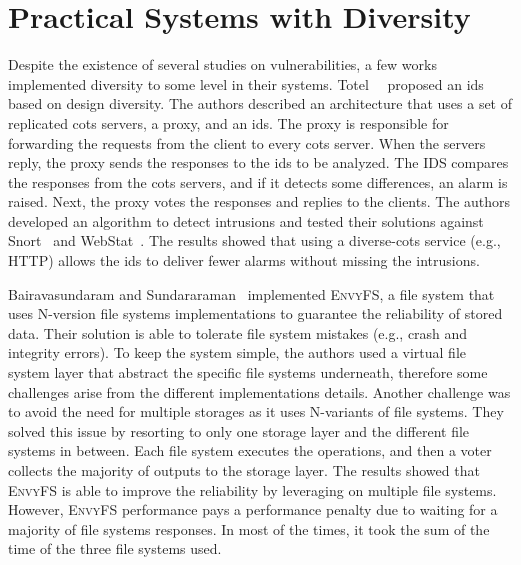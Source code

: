 \section{Practical Systems with Diversity}
Despite the existence of several studies on vulnerabilities, a few works implemented diversity to some level in their systems.
Totel~\etal{}~\cite{Totel:2005} proposed an \gls{ids} based on design diversity.
The authors described an architecture that uses a set of replicated \gls{cots} servers, a proxy, and an \gls{ids}. 
The proxy is responsible for forwarding the requests from the client to every \gls{cots} server. 
When the servers reply, the proxy sends the responses to the \gls{ids} to be analyzed. 
The IDS compares the responses from the \gls{cots} servers, and if it detects some differences, an alarm is raised. 
Next, the proxy votes the responses and replies to the clients. 
The authors developed an algorithm to detect intrusions and tested their solutions against Snort~\cite{snort} and WebStat~\cite{Vigna:2003}. 
The results showed that using a diverse-\gls{cots} service (e.g., HTTP) allows the \gls{ids} to deliver fewer alarms without missing the intrusions.

Bairavasundaram and Sundararaman~\cite{Bairavasundaram:2009} implemented \textsc{EnvyFS}, a file system that uses N-version file systems implementations to guarantee the reliability of stored data.
Their solution is able to tolerate file system mistakes (e.g., crash and integrity errors). 
To keep the system simple, the authors used a virtual file system layer that abstract the specific file systems underneath, therefore some challenges arise from the different implementations details.
Another challenge was to avoid the need for multiple storages as it uses N-variants of file systems. 
They solved this issue by resorting to only one storage layer and the different file systems in between. 
Each file system executes the operations, and then a voter collects the majority of outputs to the storage layer.
The results showed that \textsc{EnvyFS} is able to improve the reliability by leveraging on multiple file systems.
However, \textsc{EnvyFS} performance pays a performance penalty due to waiting for a majority of file systems responses. 
In most of the times, it took the sum of the time of the three file systems used.


